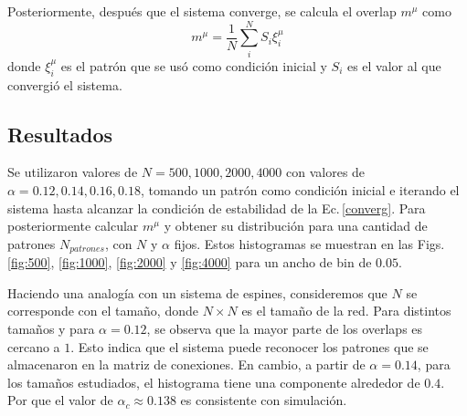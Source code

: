 Posteriormente, después que el sistema converge, se calcula el overlap $m^\mu$ como
\begin{equation}
	m^\mu = \frac{1}{N} \sum^N_i S_i \xi^\mu_i
\end{equation}
donde $\xi^\mu_i$ es el patrón que se usó como condición inicial y $S_i$ es el valor al que convergió el sistema.

\subsection{Resultados}

Se utilizaron valores de $N=500, 1000, 2000, 4000$ con valores  de $\alpha=0.12, 0.14, 0.16, 0.18$, tomando un patrón como condición inicial e iterando el sistema hasta alcanzar la condición de estabilidad de la Ec.\,\ref{converg}. Para posteriormente calcular $m^\mu$ y obtener su distribución para una cantidad de patrones $N_{patrones}$, con $N$ y $\alpha$ fijos. Estos histogramas se muestran en las Figs.\,\ref{fig:500}, \ref{fig:1000}, \ref{fig:2000} y \ref{fig:4000} para un ancho de bin de $0.05$.


Haciendo una analogía con un sistema de espines, consideremos que $N$ se corresponde con el tamaño, donde $N\times N$ es el tamaño de la red. Para distintos tamaños y para $\alpha=0.12$, se observa que la mayor parte de los overlaps es cercano a $1$. Esto indica que el sistema puede reconocer los patrones que se almacenaron en la matriz de conexiones. En cambio, a partir de $\alpha=0.14$, para los tamaños estudiados, el histograma tiene una componente alrededor de $0.4$. Por que el valor de $\alpha_c \approx 0.138$ es consistente con simulación.

